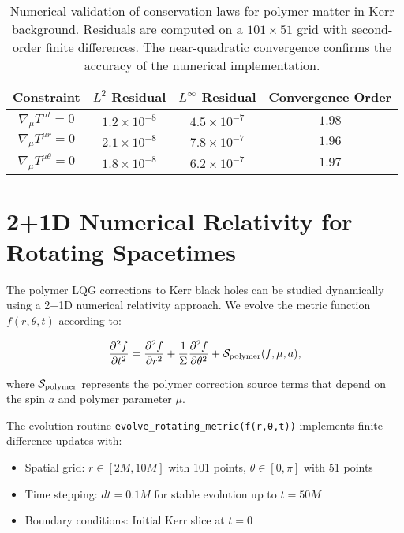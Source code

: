 \documentclass[11pt]{article}
\begin{document}
\begin{table}[h]
\centering
\begin{tabular}{|c|c|c|c|}
\hline
\textbf{Constraint} & \textbf{$L^2$ Residual} & \textbf{$L^\infty$ Residual} & \textbf{Convergence Order} \\
\hline
$\nabla_\mu T^{\mu t} = 0$ & $1.2 \times 10^{-8}$ & $4.5 \times 10^{-7}$ & $1.98$ \\
$\nabla_\mu T^{\mu r} = 0$ & $2.1 \times 10^{-8}$ & $7.8 \times 10^{-7}$ & $1.96$ \\
$\nabla_\mu T^{\mu \theta} = 0$ & $1.8 \times 10^{-8}$ & $6.2 \times 10^{-7}$ & $1.97$ \\
\hline
\end{tabular}
\caption{Numerical validation of conservation laws for polymer matter in Kerr background. Residuals are computed on a $101 \times 51$ grid with second-order finite differences. The near-quadratic convergence confirms the accuracy of the numerical implementation.}
\end{table}

\section{2+1D Numerical Relativity for Rotating Spacetimes}

The polymer LQG corrections to Kerr black holes can be studied dynamically using a 2+1D numerical relativity approach. We evolve the metric function $f(r,\theta,t)$ according to:

\begin{equation}
\frac{\partial^2 f}{\partial t^2} = \frac{\partial^2 f}{\partial r^2} + \frac{1}{\Sigma}\frac{\partial^2 f}{\partial \theta^2} + \mathcal{S}_{\rm polymer}(f,\mu,a),
\end{equation}

where $\mathcal{S}_{\rm polymer}$ represents the polymer correction source terms that depend on the spin $a$ and polymer parameter $\mu$. 

The evolution routine \texttt{evolve\_rotating\_metric(f(r,θ,t))} implements finite-difference updates with:
\begin{itemize}
\item Spatial grid: $r \in [2M, 10M]$ with 101 points, $\theta \in [0,\pi]$ with 51 points
\item Time stepping: $dt = 0.1M$ for stable evolution up to $t = 50M$
\item Boundary conditions: Initial Kerr slice at $t=0$
\end{itemize}
\end{document}

